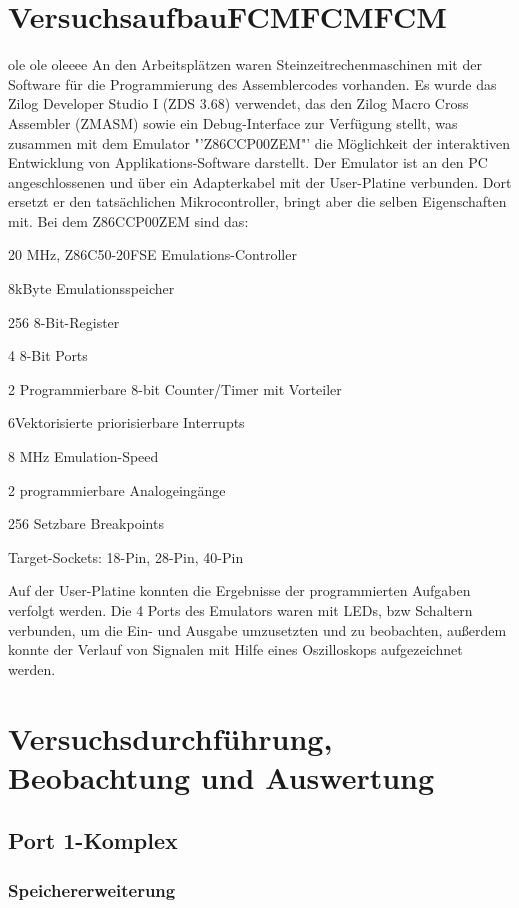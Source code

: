 \section{VersuchsaufbauFCMFCMFCM}
ole ole oleeee
An den Arbeitsplätzen waren Steinzeitrechenmaschinen mit der Software für die Programmierung des Assemblercodes vorhanden. Es wurde das Zilog Developer Studio I (ZDS 3.68) verwendet, das den Zilog Macro Cross Assembler (ZMASM) sowie ein Debug-Interface zur Verfügung stellt, was zusammen mit dem Emulator "'Z86CCP00ZEM"' die Möglichkeit der interaktiven Entwicklung von Applikations-Software darstellt. Der Emulator ist an den PC angeschlossenen und über ein Adapterkabel mit der User-Platine verbunden. Dort ersetzt er den tatsächlichen Mikrocontroller, bringt aber die selben Eigenschaften mit. Bei dem Z86CCP00ZEM sind das:
\begin{compactitem} 
\item 20 MHz, Z86C50-20FSE Emulations-Controller
\item 8kByte Emulationsspeicher
\item 256 8-Bit-Register
\item 4 8-Bit Ports
\item 2 Programmierbare 8-bit Counter/Timer mit Vorteiler 
\item 6Vektorisierte priorisierbare Interrupts
\item 8 MHz Emulation-Speed
\item 2 programmierbare Analogeingänge
\item 256 Setzbare Breakpoints
\item Target-Sockets: 18-Pin, 28-Pin, 40-Pin
\end{compactitem}
Auf der User-Platine konnten die Ergebnisse der programmierten Aufgaben verfolgt werden. Die 4 Ports des Emulators waren mit LEDs, bzw Schaltern verbunden, um die Ein- und Ausgabe umzusetzten und zu beobachten, außerdem konnte der Verlauf von Signalen mit Hilfe eines Oszilloskops aufgezeichnet werden. 

\section{Versuchsdurchführung, Beobachtung und Auswertung}
\subsection{Port 1-Komplex}
\subsubsection{Speichererweiterung}

